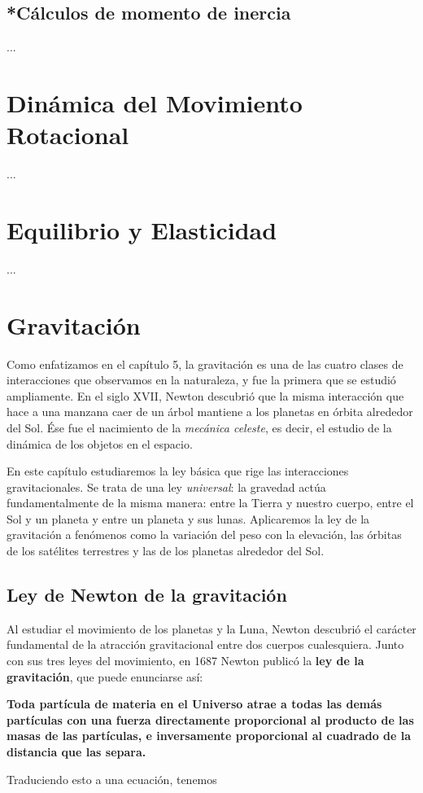 \documentclass{article}
\newcommand{\newsection}[1]{
    \pagebreak
    {\color{sectionColor}
    \centering
    \section{\bl{#1}}}
    \color{black}
    \vspace{0.5cm}
}
\newcommand{\newsubsection}[1]{
    \vspace{0.5cm}
    \color{sectionColor}
    \subsection{\bl{#1}}
    \color{black}
    \vspace{0.5cm}
}
\newcommand{\bl}[1]{\textbf{#1}}
\newcommand{\definicion}[1]{%
    \vspace{0.5cm}
    \begin{definicionbox}
        #1
    \end{definicionbox}
    \vspace{0.5cm}
}
\begin{document}
    \newsubsection{*Cálculos de momento de inercia}

    \par ... %

    \newsection{Dinámica del Movimiento Rotacional}

    \par ... %

    \newsection{Equilibrio y Elasticidad}

    \par ... %

    \newsection{Gravitación}

    \par Como enfatizamos en el capítulo 5, la gravitación es una de las cuatro clases de interacciones que observamos en la naturaleza, y fue la primera que se estudió ampliamente. En el siglo XVII, Newton descubrió que la misma interacción que hace a una manzana caer de un árbol mantiene a los planetas en órbita alrededor del Sol. Ése fue el nacimiento de la \textit{mecánica celeste}, es decir, el estudio de la dinámica de los objetos en el espacio.

    \par En este capítulo estudiaremos la ley básica que rige las interacciones gravitacionales. Se trata de una ley \textit{universal}: la gravedad actúa fundamentalmente de la misma manera: entre la Tierra y nuestro cuerpo, entre el Sol y un planeta y entre un planeta y sus lunas. Aplicaremos la ley de la gravitación a fenómenos como la variación del peso con la elevación, las órbitas de los satélites terrestres y las de los planetas alrededor del Sol.

    \newsubsection{Ley de Newton de la gravitación}

    \par Al estudiar el movimiento de los planetas y la Luna, Newton descubrió el carácter fundamental de la atracción gravitacional entre dos cuerpos cualesquiera. Junto con sus tres leyes del movimiento, en 1687 Newton publicó la \bl{ley de la gravitación}, que puede enunciarse así:

    \definicion{
        \bl{
            Toda partícula de materia en el Universo atrae a todas las demás partículas con una fuerza directamente proporcional al producto de las masas de las partículas, e inversamente proporcional al cuadrado de la distancia que las separa.
        }
    }

    \par Traduciendo esto a una ecuación, tenemos
\end{document}
